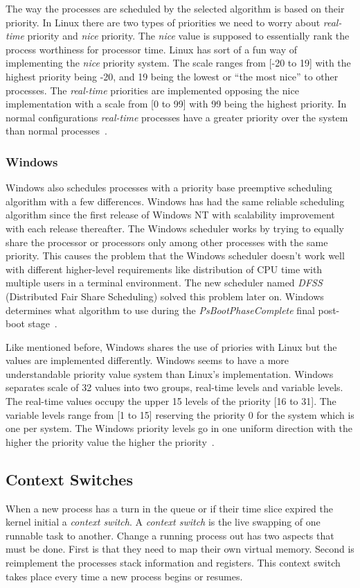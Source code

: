 \documentclass[letterpaper,10pt,notitlepage,fleqn]{article}
\begin{document}
The way the processes are scheduled by the selected algorithm is based on their priority. In Linux there are 
two types of priorities we need to worry about \textit{real-time} priority and \textit{nice}
priority. The \textit{nice} value is supposed to essentially rank the process worthiness 
for processor time. Linux has sort of a fun way of implementing the \textit{nice} 
priority system. The scale ranges from [-20 to 19] with the highest priority being -20, and
19 being the lowest or ``the most nice'' to other processes. The \textit{real-time} priorities are implemented opposing the 
nice implementation with a scale from [0 to 99] with 99 being the highest priority.
In normal configurations \textit{real-time} processes have a greater priority over 
the system than normal processes~\cite{LKD3}. 

\subsubsection*{Windows} 
Windows also schedules processes with a priority base preemptive scheduling algorithm 
with a few differences. Windows has had the same reliable scheduling algorithm since
the first release of Windows NT with scalability improvement with each release thereafter.
The Windows scheduler works by trying to equally share the processor or processors 
only among other processes with the same priority. This causes the problem that 
the Windows scheduler doesn't work well with different higher-level requirements 
like distribution of CPU time with multiple users in a terminal environment. The 
new scheduler named \textit{DFSS} (Distributed Fair Share Scheduling) solved this 
problem later on. Windows determines what algorithm to use during 
the \textit{PsBootPhaseComplete} final post-boot stage~\cite{WI16}. 

Like mentioned before, Windows shares the use of priories with Linux but the values 
are implemented differently. Windows seems to have a more understandable priority 
value system than Linux's implementation. Windows separates scale of 32 values 
into two groups, real-time levels and variable levels. The real-time values occupy 
the upper 15 levels of the priority [16 to 31]. The variable levels range from [1 to 15] 
reserving the priority 0 for the system which is one per system. The Windows priority 
levels go in one uniform direction with the higher the priority value the higher 
the priority~\cite{WI16}.

\subsection*{Context Switches}
When a new process has a turn in the queue or if their time slice expired the kernel 
initial a \textit{context switch}. A \textit{context switch} is the live swapping 
of one runnable task to another. Change a running process out has two aspects that
must be done. First is that they need to map their own virtual memory. Second is 
reimplement the processes stack information and registers. This context switch takes 
place every time a new process begins or resumes. 
\end{document}
